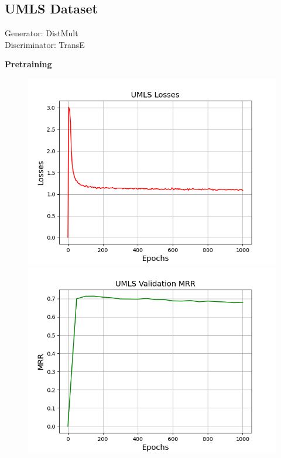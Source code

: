 \subsection{UMLS Dataset}
Generator: DistMult\\
Discriminator: TransE

\textbf{Pretraining}\\
\begin{figure}
    \centering
    \begin{minipage}{.3\textwidth}
      \centering
      \includegraphics[width=0.9\linewidth]{figures/results/UMLS/Pretraining/DistMult/pretrain_umls_losses.png}
    \end{minipage}%
    \begin{minipage}{.3\textwidth}
      \centering
      \includegraphics[width=0.9\linewidth]{figures/results/UMLS/Pretraining/DistMult/pretrain_umls_mrr.png}

\end{minipage}
\end{figure}
